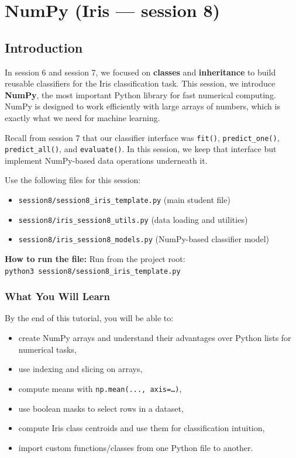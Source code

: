 \chapter{NumPy (Iris — session 8)}

\section{Introduction}
In session 6 and session 7, we focused on \textbf{classes} and \textbf{inheritance} to build reusable classifiers for the Iris classification task.
This session, we introduce \textbf{NumPy}, the most important Python library for fast numerical computing. NumPy is designed to work efficiently with large arrays of numbers, which is exactly what we need for machine learning.

Recall from session 7 that our classifier interface was \texttt{fit()}, \texttt{predict\_one()}, \texttt{predict\_all()}, and \texttt{evaluate()}.
In this session, we keep that interface but implement NumPy-based data operations underneath it.

\begin{tcolorbox}[title=You will work in]
Use the following files for this session:
\begin{itemize}
    \item \texttt{session8/session8\_iris\_template.py} (main student file)
    \item \texttt{session8/iris\_session8\_utils.py} (data loading and utilities)
    \item \texttt{session8/iris\_session8\_models.py} (NumPy-based classifier model)
\end{itemize}
\textbf{How to run the file:} Run from the project root: \\
\texttt{python3 session8/session8\_iris\_template.py}
\end{tcolorbox}

\subsection{What You Will Learn}
By the end of this tutorial, you will be able to:
\begin{itemize}\setlength{\itemsep}{0pt}
\item create NumPy arrays and understand their advantages over Python lists for numerical tasks,
\item use indexing and slicing on arrays,
\item compute means with \texttt{np.mean(..., axis=\dots)},
\item use boolean masks to select rows in a dataset,
\item compute Iris class centroids and use them for classification intuition,
\item import custom functions/classes from one Python file to another.
\end{itemize}

